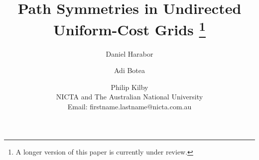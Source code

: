 \documentclass{article}
\begin{document}
\title{Path Symmetries in Undirected Uniform-Cost Grids
\thanks{A longer version of this paper is currently under review. }
}
\author{Daniel Harabor \and Adi Botea \and Philip Kilby \\
NICTA and The Australian National University \\
Email: firstname.lastname@nicta.com.au}

\maketitle












%



\end{document}
